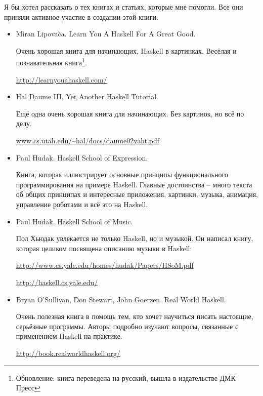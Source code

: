 Я бы хотел рассказать о тех книгах и статьях, которые 
мне помогли. Все они приняли активное участие в 
создании этой книги.


\begin{itemize}
\item Miran Lipova\u{c}a. Learn You A Haskell For A Great Good.
        
    Очень хорошая книга для начинающих, Haskell в картинках.
    Весёлая и познавательная книга\footnote{Обновление: книга переведена 
    на русский, вышла в издательстве ДМК Пресс}.

    \url{http://learnyouahaskell.com/}

\item Hal Daume III. Yet Another Haskell Tutorial.

    Ещё одна очень хорошая книга для начинающих. 
    Без картинок, но всё по делу. 

    \url{www.cs.utah.edu/~hal/docs/daume02yaht.pdf}

\item Paul Hudak. Haskell School of Expression.
    
    Книга, которая иллюстрирует основные принципы
    функционального программирования на примере Haskell.
    Главные достоинства -- много текста об общих 
    принципах и интересные приложения,
    картинки, музыка, анимация, управление роботами и 
    всё это на Haskell.

\item Paul Hudak. Haskell School of Music.

    Пол Хьюдак увлекается не только Haskell, но и музыкой.
    Он написал книгу, которая целиком посвящена описанию музыки в Haskell:

    \url{http://www.cs.yale.edu/homes/hudak/Papers/HSoM.pdf}

    \url{http://haskell.cs.yale.edu/}

\item Bryan O'Sullivan, Don Stewart, John Goerzen. Real World Haskell.

    Очень полезная книга в помощь тем, кто хочет научиться
    писать настоящие, серьёзные программы. Авторы подробно
    изучают вопросы, связанные с применением Haskell на практике.
    
    \url{http://book.realworldhaskell.org/}

\end{itemize}



